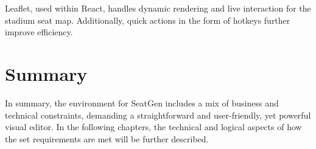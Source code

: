 Leaflet, used within React, handles dynamic rendering and live interaction for the stadium seat map. Additionally, quick actions in the form of hotkeys further improve efficiency.

\section{Summary}
In summary, the environment for SeatGen includes a mix of business and technical constraints, demanding a straightforward and user-friendly, yet powerful visual editor. In the following chapters, the technical and logical aspects of how the set requirements are met will be further described.